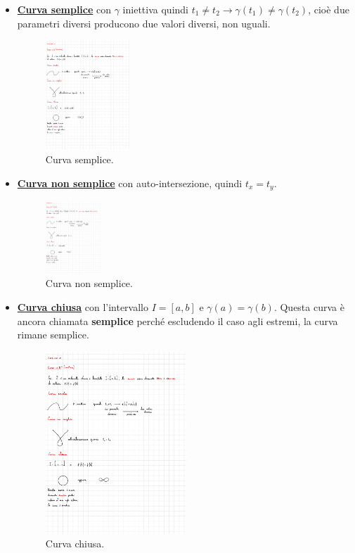 \documentclass[a4paper]{article}
\begin{document}
	\begin{itemize}
		\item \textcolor{Red3}{\textbf{\underline{Curva semplice}}} con $\gamma$ iniettiva quindi $t_{1} \ne t_{2} \longrightarrow \gamma\left(t_{1}\right) \ne \gamma\left(t_{2}\right)$, cioè due parametri diversi producono due valori diversi, non uguali.
		\begin{figure}[!htp]
			\centering
			\includegraphics[width=0.3\textwidth]{img/curva_semplice.pdf}
			\caption{Curva semplice.}
		\end{figure}
	
		\item \textcolor{Red3}{\textbf{\underline{Curva non semplice}}} con auto-intersezione, quindi $t_{x} = t_{y}$.
		\begin{figure}[!htp]
			\centering
			\includegraphics[width=0.2\textwidth]{img/curva_non_semplice.pdf}
			\caption{Curva non semplice.}
		\end{figure}
	
		\item \textcolor{Red3}{\textbf{\underline{Curva chiusa}}} con l'intervallo $I = \left[a,b\right]$ e $\gamma\left(a\right) = \gamma\left(b\right)$. Questa curva è ancora chiamata \textcolor{Red3}{\textbf{semplice}} perché escludendo il caso agli estremi, la curva rimane semplice.
		\begin{figure}[!htp]
			\centering
			\includegraphics[width=0.5\textwidth]{img/curva_chiusa.pdf}
			\caption{Curva chiusa.}
		\end{figure}
	\end{itemize}
	
\end{document}
